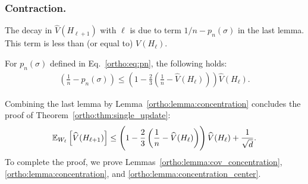  \subsubsection*{Contraction.} 
 The decay in $\widehat{V}(H_{\ell+1})$ with $\ell$ is due to term $1/n-p_n(\sigma)$ in the last lemma. This term is less than (or equal to) $V(H_\ell)$.
 \begin{lemma} \label{ortho:lemma:concentration_center}
 For $p_n(\sigma)$ defined in Eq.~\eqref{ortho:eq:pn}, the following holds:
 \begin{align*}
   \left( \frac{1}{n}- p_n(\sigma) \right) \leq \left(1- \frac{2}{3} \left(\frac{1}{n}- \widehat{V}(H_\ell)\right) \right) \widehat{V}(H_\ell).
 \end{align*}
 \end{lemma}
 Combining the last lemma by Lemma~\ref{ortho:lemma:concentration} concludes the proof of Theorem~\ref{ortho:thm:single_update}: 
 \begin{align} \label{ortho:eq:onestep_result_app}
     \mathbb{E}_{W_\ell} \left[  \widehat{V}(H_{\ell+1}) \right] \leq  \left(1- \frac{2}{3} \left(\frac{1}{n}- \widehat{V}(H_\ell)\right) \right) \widehat{V}(H_\ell) + \frac{1}{\sqrt{d}}.
   \end{align}
 To complete the proof, we prove Lemmas~\ref{ortho:lemma:cov_concentration}, \ref{ortho:lemma:concentration}, and \ref{ortho:lemma:concentration_center}.
